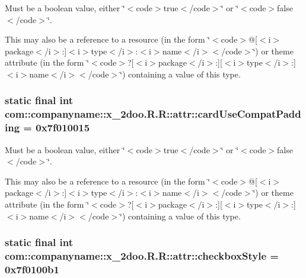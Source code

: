 Must be a boolean value, either \char`\"{}$<$code$>$true$<$/code$>$\char`\"{} or \char`\"{}$<$code$>$false$<$/code$>$\char`\"{}. 

This may also be a reference to a resource (in the form \char`\"{}$<$code$>$@\mbox{[}$<$i$>$package$<$/i$>$:\mbox{]}$<$i$>$type$<$/i$>$:$<$i$>$name$<$/i$>$$<$/code$>$\char`\"{}) or theme attribute (in the form \char`\"{}$<$code$>$?\mbox{[}$<$i$>$package$<$/i$>$:\mbox{]}\mbox{[}$<$i$>$type$<$/i$>$:\mbox{]}$<$i$>$name$<$/i$>$$<$/code$>$\char`\"{}) containing a value of this type. \hypertarget{classcom_1_1companyname_1_1x__2doo_1_1_r_1_1attr_f2e8bb945e46330483929fb68bce113d}{
\subsubsection[{cardUseCompatPadding}]{\setlength{\rightskip}{0pt plus 5cm}static final int com::companyname::x\_\-2doo.R.R::attr::cardUseCompatPadding = 0x7f010015}}
\label{classcom_1_1companyname_1_1x__2doo_1_1_r_1_1attr_f2e8bb945e46330483929fb68bce113d}


Must be a boolean value, either \char`\"{}$<$code$>$true$<$/code$>$\char`\"{} or \char`\"{}$<$code$>$false$<$/code$>$\char`\"{}. 

This may also be a reference to a resource (in the form \char`\"{}$<$code$>$@\mbox{[}$<$i$>$package$<$/i$>$:\mbox{]}$<$i$>$type$<$/i$>$:$<$i$>$name$<$/i$>$$<$/code$>$\char`\"{}) or theme attribute (in the form \char`\"{}$<$code$>$?\mbox{[}$<$i$>$package$<$/i$>$:\mbox{]}\mbox{[}$<$i$>$type$<$/i$>$:\mbox{]}$<$i$>$name$<$/i$>$$<$/code$>$\char`\"{}) containing a value of this type. \hypertarget{classcom_1_1companyname_1_1x__2doo_1_1_r_1_1attr_74aa4831fd3b631cc6fd50f12888c305}{
\subsubsection[{checkboxStyle}]{\setlength{\rightskip}{0pt plus 5cm}static final int com::companyname::x\_\-2doo.R.R::attr::checkboxStyle = 0x7f0100b1}}
\label{classcom_1_1companyname_1_1x__2doo_1_1_r_1_1attr_74aa4831fd3b631cc6fd50f12888c305}



